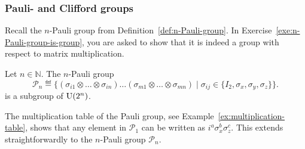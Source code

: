 \documentclass[a4paper, oneside, 12pt]{amsart}
\newcommand*{\PauliGroup}{\ensuremath{\mathcal{P}}}
\begin{document}
\subsubsection{Pauli- and Clifford groups}\label{sec:pauli--and-clifford-groups}

Recall the \(n\)-Pauli group from Definition~\ref{def:n-Pauli-group}.
In  Exercise~\ref{exe:n-Pauli-group-is-group}, you are asked to show that it is indeed a group with respect to matrix multiplication.

\begin{lemma}\label{lem:Pauli-group}
  Let \(n \in \mathbb{N}\).
  The \(n\)-Pauli group
  \begin{equation*}
    \PauliGroup_{n} \eqdef\big\{ (\sigma_{i1}\otimes \dots \otimes \sigma_{in}) \dots  (\sigma_{m1}\otimes \dots \otimes \sigma_{mn}) \mid \sigma_{ij} \in\{ I_{2}, \sigma_{x}, \sigma_{y}, \sigma_{z}\}\big\}.
  \end{equation*}
  is a subgroup of \(\operatorname{U}(2^{n})\).
\end{lemma}

The multiplication table of the Pauli group, see Example~\ref{ex:multiplication-table}, shows that any element in \(\PauliGroup_{1}\) can be written as \(i^{a}\sigma_{x}^{b}\sigma_{z}^{c}\).
This extends straightforwardly to the \(n\)-Pauli group \(\PauliGroup_{n}\).
\end{document}
